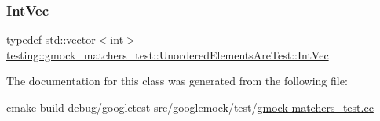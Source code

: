 \subsubsection{\texorpdfstring{IntVec}{IntVec}}
{\footnotesize\ttfamily typedef std\+::vector$<$int$>$ \mbox{\hyperlink{classtesting_1_1gmock__matchers__test_1_1UnorderedElementsAreTest_a608750c71652943bd11fe7bb5281588d}{testing\+::gmock\+\_\+matchers\+\_\+test\+::\+Unordered\+Elements\+Are\+Test\+::\+Int\+Vec}}\hspace{0.3cm}{\ttfamily [protected]}}



The documentation for this class was generated from the following file\+:\begin{DoxyCompactItemize}
\item 
cmake-\/build-\/debug/googletest-\/src/googlemock/test/\mbox{\hyperlink{gmock-matchers__test_8cc}{gmock-\/matchers\+\_\+test.\+cc}}\end{DoxyCompactItemize}
